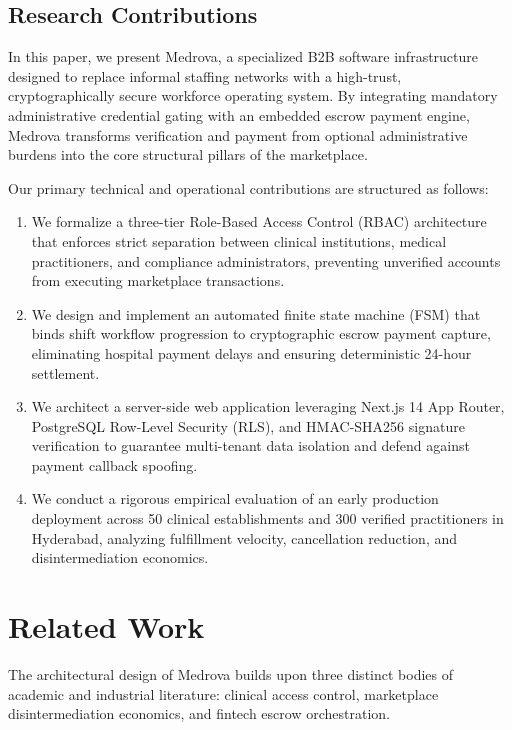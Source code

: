 \documentclass[conference]{IEEEtran}
\begin{document}
\subsection{Research Contributions}
In this paper, we present Medrova, a specialized B2B software infrastructure designed to replace informal staffing networks with a high-trust, cryptographically secure workforce operating system. By integrating mandatory administrative credential gating with an embedded escrow payment engine, Medrova transforms verification and payment from optional administrative burdens into the core structural pillars of the marketplace.

Our primary technical and operational contributions are structured as follows:
\begin{enumerate}
    \item We formalize a three-tier Role-Based Access Control (RBAC) architecture that enforces strict separation between clinical institutions, medical practitioners, and compliance administrators, preventing unverified accounts from executing marketplace transactions.
    \item We design and implement an automated finite state machine (FSM) that binds shift workflow progression to cryptographic escrow payment capture, eliminating hospital payment delays and ensuring deterministic 24-hour settlement.
    \item We architect a server-side web application leveraging Next.js 14 App Router, PostgreSQL Row-Level Security (RLS), and HMAC-SHA256 signature verification to guarantee multi-tenant data isolation and defend against payment callback spoofing.
    \item We conduct a rigorous empirical evaluation of an early production deployment across 50 clinical establishments and 300 verified practitioners in Hyderabad, analyzing fulfillment velocity, cancellation reduction, and disintermediation economics.
\end{enumerate}

\section{Related Work}
The architectural design of Medrova builds upon three distinct bodies of academic and industrial literature: clinical access control, marketplace disintermediation economics, and fintech escrow orchestration.
\end{document}
